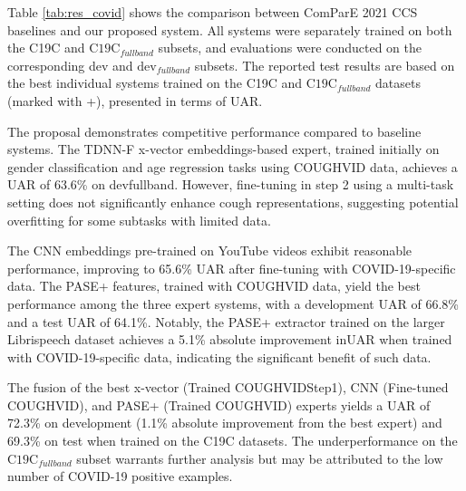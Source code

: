   Table \ref{tab:res_covid} shows the comparison between ComParE 2021 CCS baselines and our proposed system. All systems were separately trained on both the C19C and $\text{C19C}_{fullband}$ subsets, and evaluations were conducted on the corresponding dev and $\text{dev}_{fullband}$ subsets. The reported test results are based on the best individual systems trained on the C19C and $\text{C19C}_{fullband}$ datasets (marked with +), presented in terms of \ac{UAR}.

  The proposal demonstrates competitive performance compared to baseline systems. The \ac{TDNN-F} x-vector embeddings-based expert, trained initially on gender classification and age regression tasks using COUGHVID data, achieves a \ac{UAR} of 63.6\% on devfullband. However, fine-tuning in step 2 using a multi-task setting does not significantly enhance cough representations, suggesting potential overfitting for some subtasks with limited data.
  
  The \ac{CNN} embeddings pre-trained on YouTube videos exhibit reasonable performance, improving to 65.6\% \ac{UAR} after fine-tuning with COVID-19-specific data. The PASE+ features, trained with COUGHVID data, yield the best performance among the three expert systems, with a development \ac{UAR} of 66.8\% and a test \ac{UAR} of 64.1\%. Notably, the \ac{PASE}+ extractor trained on the larger Librispeech dataset achieves a 5.1\% absolute improvement in\ac{UAR} when trained with COVID-19-specific data, indicating the significant benefit of such data.
  
  The fusion of the best x-vector (Trained COUGHVIDStep1), \ac{CNN} (Fine-tuned COUGHVID), and \ac{PASE}+ (Trained COUGHVID) experts yields a \ac{UAR} of 72.3\% on development (1.1\% absolute improvement from the best expert) and 69.3\% on test when trained on the C19C datasets. The underperformance on the $\text{C19C}_{fullband}$ subset warrants further analysis but may be attributed to the low number of COVID-19 positive examples.


